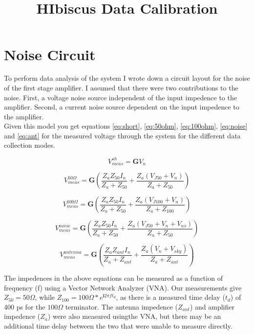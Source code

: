 \documentclass[9pt]{article}
\begin{document}
\title{HIbiscus Data Calibration}
\maketitle

\section{Noise Circuit}
To perform data analysis of the system I wrote down a circuit layout for the noise of the first stage amplifier. I assumed that there were two contributions to the noise. First, a voltage noise source independent of the input impedence to the amplifier. Second, a current noise source dependent on the input impedence to the amplifier. \\

Given this model you get equations \ref{eq:short}, \ref{eq:50ohm}, \ref{eq:100ohm}, \ref{eq:noise} and \ref{eq:ant} for the measured voltage through the system for the different data collection modes.

\begin{center}
\begin{equation}\label{eq:short}
V^{sh}_{meas} = \mathbf{G} V_n
\end{equation}

\begin{equation} \label{eq:50ohm}
V^{50 \Omega}_{meas} = \mathbf{G}\left( \frac{Z_aZ_{50}I_n}{Z_a+Z_{50}}+\frac{Z_a (V_{J50}+V_n)}{Z_a+Z_{50}} \right)
\end{equation}

\begin{equation} \label{eq:100ohm}
V^{100 \Omega}_{meas} = \mathbf{G}\left( \frac{Z_aZ_{50}I_n}{Z_a+Z_{50}}+\frac{Z_a (V_{J100}+V_n)}{Z_a+Z_{100}} \right)
\end{equation}

\begin{equation} \label{eq:noise}
V^{noise}_{meas} = \mathbf{G}\left( \frac{Z_aZ_{50}I_n}{Z_a+Z_{50}}+\frac{Z_a (V_{J50}+V_n+V_{ns})}{Z_a+Z_{50}} \right)
\end{equation}

\begin{equation} \label{eq:ant}
V^{antenna}_{meas} = \mathbf{G}\left( \frac{Z_aZ_{ant}I_n}{Z_a+Z_{ant}}+\frac{Z_a(V_n+V_{sky})}{Z_a+Z_{ant}} \right)
\end{equation}
\end{center}

The impedences in the above equations can be measured as a function of frequency (f) using a Vector Network Analyzer (VNA). Our measurements give $Z_{50} = 50 \Omega$, while $Z_{100} = 100 \Omega * e^{\mathbf{i} 2 \pi f t_d}$, as there is a measured time delay ($t_d$) of 400 ps for the $100 \Omega$ terminator. The antenna impedence ($Z_{ant}$) and amplifier impedence ($Z_a$) were also measured usingthe VNA, but there may be an additional time delay between the two that were unable to measure directly.\\
\end{document}
